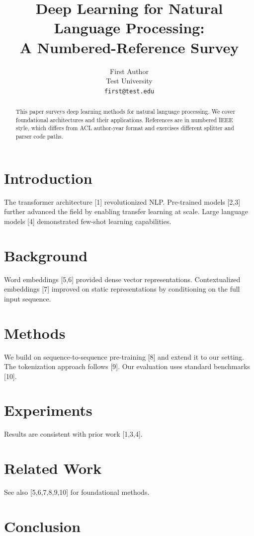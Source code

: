 \documentclass[11pt]{article}
\title{Deep Learning for Natural Language Processing:\\A Numbered-Reference Survey}
\author{First Author \\ Test University \\ \texttt{first@test.edu}}
\date{}
\begin{document}
\maketitle

\begin{abstract}
This paper surveys deep learning methods for natural language processing.
We cover foundational architectures and their applications.
References are in numbered IEEE style, which differs from ACL author-year format
and exercises different splitter and parser code paths.
\end{abstract}

\section{Introduction}
The transformer architecture [1] revolutionized NLP. Pre-trained models [2,3]
further advanced the field by enabling transfer learning at scale.
Large language models [4] demonstrated few-shot learning capabilities.

\lipsum[1-3]

\section{Background}
Word embeddings [5,6] provided dense vector representations.
Contextualized embeddings [7] improved on static representations by conditioning
on the full input sequence.

\lipsum[4-6]

\section{Methods}
We build on sequence-to-sequence pre-training [8] and extend it to our setting.
The tokenization approach follows [9]. Our evaluation uses standard benchmarks [10].

\lipsum[7-9]

\section{Experiments}
\lipsum[10-12]
Results are consistent with prior work [1,3,4].

\section{Related Work}
\lipsum[13-15]
See also [5,6,7,8,9,10] for foundational methods.

\section{Conclusion}
\lipsum[16]
\end{document}
